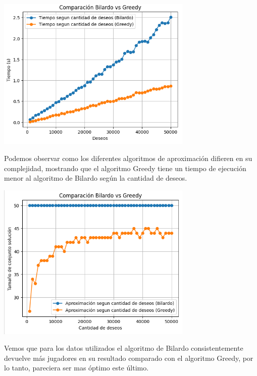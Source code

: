 \documentclass{estilo}
\begin{document}
\begin{center}
\includegraphics[width=0.7\textwidth]{img/bilardo_vs_greedy_1.png}

Podemos observar como los diferentes algoritmos de aproximación difieren en su complejidad, mostrando que el algoritmo Greedy tiene un tiempo de ejecución menor al algoritmo de Bilardo según la cantidad de deseos.
\end{center}

\begin{center}
\includegraphics[width=0.7\textwidth]{img/bilardo_vs_greedy_2.png}

Vemos que para los datos utilizados el algoritmo de Bilardo consistentemente devuelve más jugadores en su resultado comparado con el algoritmo Greedy, por lo tanto, pareciera ser mas óptimo este último.
\end{center}
\end{document}
